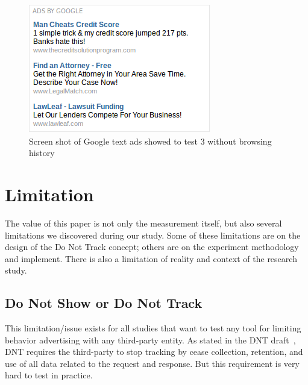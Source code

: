 \documentclass{sig-alternate}
\begin{document}
\begin{figure}
\begin{center}
\includegraphics[width=0.9\columnwidth]{textadrandom}
\end{center}
\caption{Screen shot of Google text ads showed to test 3 without browsing history}
\label{fig:textadrandom}
\end{figure}

\section{Limitation} \label{sec:limitation}


The value of this paper is not only the measurement itself, but also several limitations we discovered during our study. Some of these limitations are on the design of the Do Not Track concept; others are on the experiment methodology and implement. There is also a limitation of reality and context of the research study.

\subsection{Do Not Show or Do Not Track}

This limitation/issue exists for all studies that want to test any tool for limiting behavior advertising with any third-party entity. As stated in the DNT draft~\cite{dntdraft}, DNT requires the third-party to stop tracking by cease collection, retention, and use of all data related to the request and response. But this requirement is very hard to test in practice. 
\end{document}
